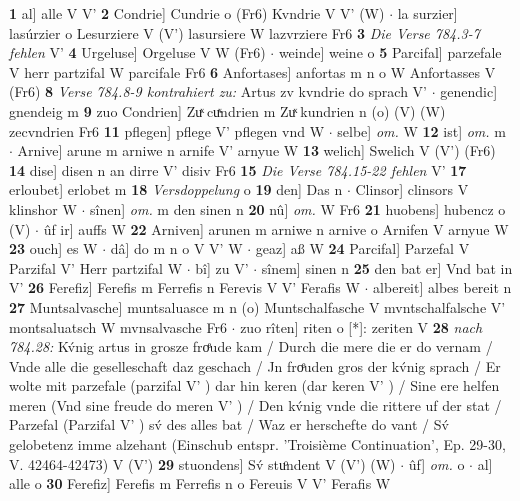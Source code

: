 \documentclass[8pt,a4paper,notitlepage]{article}
\begin{document}
\begin{table}[ht]
\begin{minipage}[t]{0.5\linewidth}
\textbf{1} al] alle V V' \textbf{2} Condrie] Cundrie o (Fr6) Kvndrie V V' (W)  $\cdot$ la surzier] lasúrzier o Lesurziere V (V') lasursiere W lazvrziere Fr6 \textbf{3} \textit{Die Verse 784.3-7 fehlen} V'  \textbf{4} Urgeluse] Orgeluse V W (Fr6)  $\cdot$ weinde] weine o \textbf{5} Parcifal] parzefale V herr partzifal W parcifale Fr6 \textbf{6} Anfortases] anfortas m n o W Anfortasses V (Fr6) \textbf{8} \textit{Verse 784.8-9 kontrahiert zu:} Artus zv kvndrie do sprach V'   $\cdot$ genendic] gnendeig m \textbf{9} zuo Condrien] Zuͯ cuͯndrien m Zuͯ kundrien n (o) (V) (W) zecvndrien Fr6 \textbf{11} pflegen] pflege V' pflegen vnd W  $\cdot$ selbe] \textit{om.} W \textbf{12} ist] \textit{om.} m  $\cdot$ Arnive] arune m arniwe n arnife V' arnyue W \textbf{13} welich] Swelich V (V') (Fr6) \textbf{14} dise] disen n an dirre V' disiv Fr6 \textbf{15} \textit{Die Verse 784.15-22 fehlen} V'  \textbf{17} erloubet] erlobet m \textbf{18} \textit{Versdoppelung} o  \textbf{19} den] Das n  $\cdot$ Clinsor] clinsors V klinshor W  $\cdot$ sînen] \textit{om.} m den sinen n \textbf{20} nû] \textit{om.} W Fr6 \textbf{21} huobens] hubencz o (V)  $\cdot$ ûf ir] auffs W \textbf{22} Arniven] arunen m arniwe n arnive o Arnifen V arnyue W \textbf{23} ouch] es W  $\cdot$ dâ] do m n o V V' W  $\cdot$ geaz] aß W \textbf{24} Parcifal] Parzefal V Parzifal V' Herr partzifal W  $\cdot$ bî] zu V'  $\cdot$ sînem] sinen n \textbf{25} den bat er] Vnd bat in V' \textbf{26} Ferefiz] Ferefis m Ferrefis n Ferevis V V' Ferafis W  $\cdot$ albereit] albes bereit n \textbf{27} Muntsalvasche] muntsaluasce m n (o) Muntschalfasche V mvntschalfalsche V' montsaluatsch W mvnsalvasche Fr6  $\cdot$ zuo rîten] riten o [*]: zeriten V \textbf{28} \textit{nach 784.28:} Kv́nig artus in grosze froͤude kam / Durch die mere die er do vernam / Vnde alle die geselleschaft daz geschach / Jn froͤuden gros der kv́nig sprach / Er wolte mit parzefale (parzifal V'  ) dar hin keren (dar keren V'  ) / Sine ere helfen meren (Vnd sine freude do meren V'  ) / Den kv́nig vnde die rittere uf der stat / Parzefal (Parzifal V'  ) sv́ des alles bat / Waz er herschefte do vant / Sv́ gelobetenz imme alzehant (Einschub entspr. 'Troisième Continuation', Ep. 29-30, V. 42464-42473) V (V')  \textbf{29} stuondens] Sv́ stuͦndent V (V') (W)  $\cdot$ ûf] \textit{om.} o  $\cdot$ al] alle o \textbf{30} Ferefiz] Ferefis m Ferrefis n o Fereuis V V' Ferafis W \newline
\end{minipage}
\end{table}
\newpage
\end{document}
